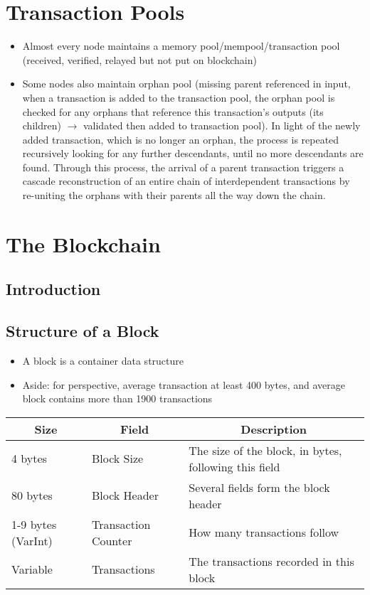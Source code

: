 \documentclass[english, 11pt]{article}
\begin{document}
\section{Transaction Pools}
\begin{itemize}
    \item Almost every node maintains a memory pool/mempool/transaction pool (received, verified, relayed but not put on blockchain)
    \item Some nodes also maintain orphan pool (missing parent referenced in input, when a transaction is added to the transaction pool, the orphan pool is checked for any orphans that reference this transaction’s outputs (its children) $\rightarrow$ validated then added to transaction pool). In light of the newly added transaction, which is no longer an orphan, the process is repeated recursively looking for any further descendants, until no more descendants are found. Through this process, the arrival of a parent transaction triggers a cascade reconstruction of an entire chain of interdependent transactions by re-uniting the orphans with their parents all the way down the chain.
\end{itemize}

\section{The Blockchain}

\subsection{Introduction}

\subsection{Structure of a Block}
\begin{itemize}
    \item A block is a container data structure
    \item Aside: for perspective, average transaction at least 400 bytes, and average block contains more than 1900 transactions
\end{itemize}

\begin{table}[htbp]
\begin{tabular}{|l|l|l|}
\hline
\multicolumn{1}{|c|}{\textbf{Size}} & \multicolumn{1}{c|}{\textbf{Field}} & \multicolumn{1}{c|}{\textbf{Description}} \\ \hline
4 bytes & Block Size & The size of the block, in bytes, following this field \\ \hline
80 bytes & Block Header & Several fields form the block header \\ \hline
1-9 bytes (VarInt) & Transaction Counter & How many transactions follow \\ \hline
Variable & Transactions & The transactions recorded in this block \\ \hline
\end{tabular}
\end{table}
\end{document}
